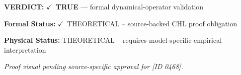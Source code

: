 \textbf{VERDICT:} \ensuremath{\checkmark}\ \textbf{TRUE} --- formal dynamical-operator validation

\textbf{Formal Status:} \ensuremath{\checkmark}\ THEORETICAL -- source-backed CHL proof obligation

\textbf{Physical Status:} THEORETICAL -- requires model-specific empirical interpretation
\par\vspace{0.45em}
\par
\vfill
\begingroup\footnotesize\itshape
Proof visual pending source-specific approval for [ID 0468].
\par\endgroup
\vfill
\endgroup
\endgroup
